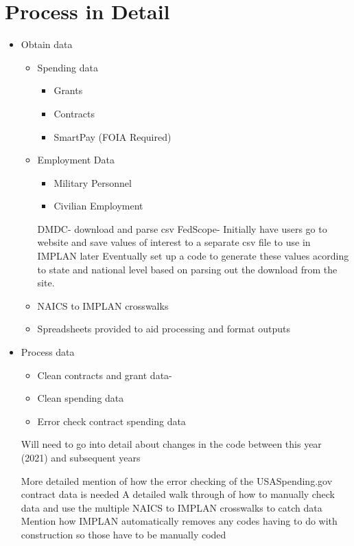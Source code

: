 \documentclass[
]{book}
\providecommand{\tightlist}{%
  \setlength{\itemsep}{0pt}\setlength{\parskip}{0pt}}
\begin{document}
\hypertarget{process-in-detail}{%
\section{Process in Detail}\label{process-in-detail}}

\begin{itemize}
\item
  Obtain data

  \begin{itemize}
  \item
    Spending data

    \begin{itemize}
    \tightlist
    \item
      Grants
    \item
      Contracts
    \item
      SmartPay (FOIA Required)
    \end{itemize}
  \item
    Employment Data

    \begin{itemize}
    \tightlist
    \item
      Military Personnel
    \item
      Civilian Employment
    \end{itemize}

    DMDC- download and parse csv
    FedScope- Initially have users go to website and save values of interest to a separate csv file to use in IMPLAN later
    Eventually set up a code to generate these values acording to state and national level based on parsing out the download from
    the site.
  \item
    NAICS to IMPLAN crosswalks
  \item
    Spreadsheets provided to aid processing and format outputs
  \end{itemize}
\item
  Process data

  \begin{itemize}
  \tightlist
  \item
    Clean contracts and grant data-
  \item
    Clean spending data
  \item
    Error check contract spending data
  \end{itemize}

  Will need to go into detail about changes in the code between this year (2021) and subsequent years

  More detailed mention of how the error checking of the USASpending.gov contract data is needed
  A detailed walk through of how to manually check data and use the multiple NAICS to IMPLAN crosswalks to catch data
  Mention how IMPLAN automatically removes any codes having to do with construction so those have to be manually coded


\end{itemize}
\end{document}
